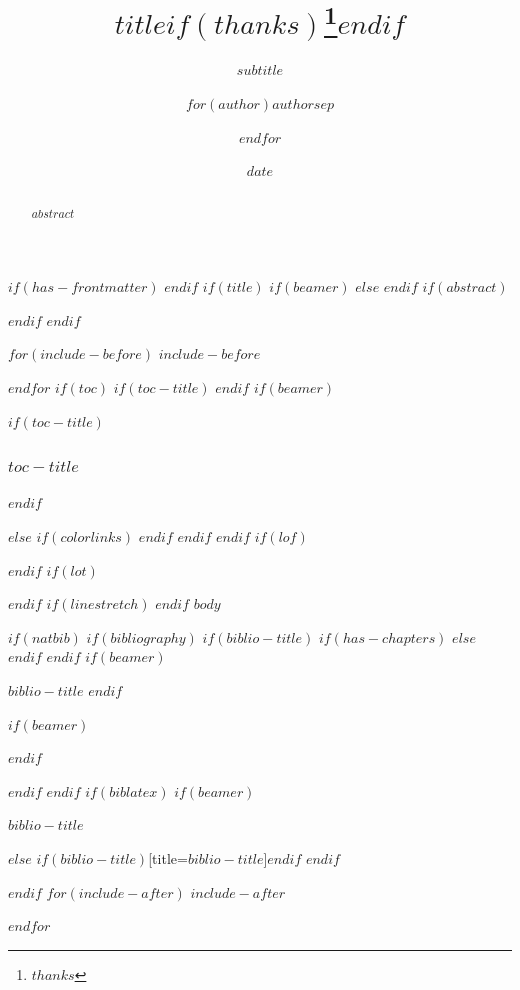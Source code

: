 \documentclass[
$if(fontsize)$
  $fontsize$,
$endif$
$if(papersize)$
  $papersize$paper,
$endif$
$if(beamer)$
  ignorenonframetext,
$if(handout)$
  handout,
$endif$
$if(aspectratio)$
  aspectratio=$aspectratio$,
$endif$
$endif$
$for(classoption)$
  $classoption$$sep$,
$endfor$
]{$documentclass$}
\title{$title$$if(thanks)$\thanks{$thanks$}$endif$}
\subtitle{$subtitle$}
\author{$for(author)$$author$$sep$ \and $endfor$}
\date{$date$}
\institute{$for(institute)$$institute$$sep$ \and $endfor$}
\newif\ifbibliography
\begin{document}
$if(has-frontmatter)$
\frontmatter
$endif$
$if(title)$
$if(beamer)$
\frame{\titlepage}
$else$
\booktitlepage
\bookcolophon
$endif$
$if(abstract)$
\begin{abstract}
$abstract$
\end{abstract}
$endif$
$endif$

$for(include-before)$
$include-before$

$endfor$
$if(toc)$
$if(toc-title)$
\renewcommand*\contentsname{$toc-title$}
$endif$
$if(beamer)$
\begin{frame}[allowframebreaks]
$if(toc-title)$
  \frametitle{$toc-title$}
$endif$
  \tableofcontents[hideallsubsections]
\end{frame}
$else$
{
$if(colorlinks)$
\hypersetup{linkcolor=$if(toccolor)$$toccolor$$else$$endif$}
$endif$
\setcounter{tocdepth}{$toc-depth$}
\tableofcontents
}
$endif$
$endif$
$if(lof)$
\listoffigures
$endif$
$if(lot)$
\listoftables
$endif$
$if(linestretch)$
$endif$
$body$

$if(natbib)$
$if(bibliography)$
$if(biblio-title)$
$if(has-chapters)$
\renewcommand\bibname{$biblio-title$}
$else$
\renewcommand\refname{$biblio-title$}
$endif$
$endif$
$if(beamer)$
\begin{frame}[allowframebreaks]{$biblio-title$}
  \bibliographytrue
$endif$
  
$if(beamer)$
\end{frame}
$endif$

$endif$
$endif$
$if(biblatex)$
$if(beamer)$
\begin{frame}[allowframebreaks]{$biblio-title$}
  \bibliographytrue
  \printbibliography[heading=none]
\end{frame}
$else$
\printbibliography$if(biblio-title)$[title=$biblio-title$]$endif$
$endif$

$endif$
$for(include-after)$
$include-after$

$endfor$
\end{document}
